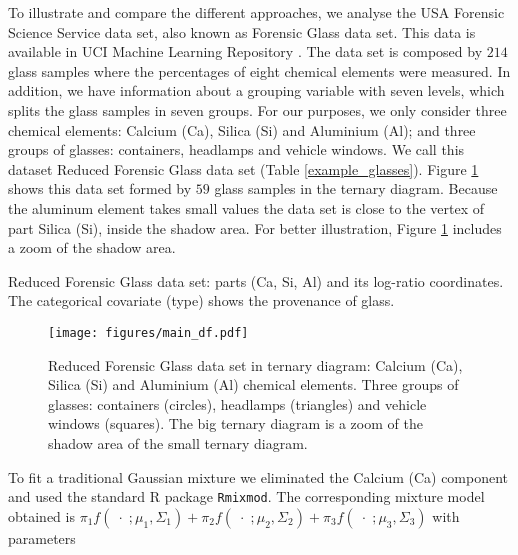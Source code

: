 \documentclass[12pt, a4paper]{article}
\begin{document}
\noindent To illustrate and compare the different approaches, we analyse the USA Forensic Science Service data set, also known as Forensic Glass data set. This data is available in UCI Machine Learning Repository \citep{uci2007repository}.  The data set is composed by  $214$ glass samples where the percentages of eight chemical elements were measured. In addition, we have information about a grouping variable with seven levels, which splits the glass samples in seven groups. For our purposes, we only consider three chemical elements: Calcium (Ca), Silica (Si) and Aluminium (Al); and three groups of glasses: containers, headlamps and vehicle windows. We call this dataset Reduced Forensic Glass data set (Table \ref{example_glasses}). Figure \ref{fig04} shows this data set formed by $59$ glass samples in the ternary diagram. Because the aluminum element takes small values the data set is close to the vertex of part Silica (Si), inside the shadow area. For better illustration, Figure \ref{fig04} includes a zoom of the shadow area.


\begin{table}
\centering
\scriptsize


%
\caption{Reduced Forensic Glass data set: parts (Ca, Si, Al) and its log-ratio coordinates. 
The categorical covariate  (type) shows the provenance of glass.}
\label{example_glasses}
\end{table}

% 
% 

\begin{figure}[htbp]
\centering
\texttt{[image: figures/main\_df.pdf]}%
\caption{Reduced Forensic Glass data set in ternary diagram: Calcium (Ca), Silica (Si) and Aluminium (Al) chemical elements. Three groups of glasses: containers (circles), headlamps (triangles) and vehicle windows (squares). The big ternary diagram is a zoom of the shadow area of the small ternary diagram.}
\label{fig04}
\end{figure}


To fit a traditional Gaussian mixture we eliminated the Calcium (Ca) component and used the standard R package \texttt{Rmixmod}. The corresponding mixture model obtained is
$
\pi_1 f(\;\cdot\; ; \mu_1, \Sigma_1) + \pi_2 f(\;\cdot\; ; \mu_2, \Sigma_2) + \pi_3 f(\;\cdot\; ; \mu_3, \Sigma_3)
$
with parameters
\end{document}
